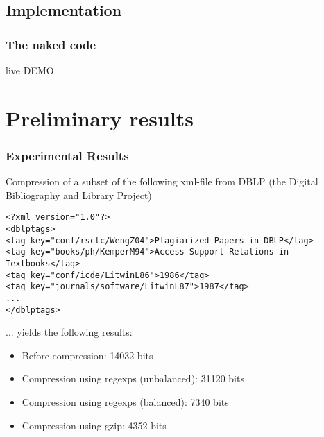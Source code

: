 \documentclass[slidestop,compress,mathserif, xcolor=table]{beamer}
\begin{document}
\subsection{Implementation}

\begin{frame}[c]
  \frametitle{The naked code}

  \begin{center}
    \Huge{live DEMO}
  \end{center}
  
\end{frame}

\section{Preliminary results}

\begin{frame}[fragile]
  \frametitle{Experimental Results}

  Compression of a subset of the following xml-file from DBLP (the Digital
  Bibliography and Library Project)

{\tiny
\begin{verbatim}
<?xml version="1.0"?>
<dblptags>
<tag key="conf/rsctc/WengZ04">Plagiarized Papers in DBLP</tag>
<tag key="books/ph/KemperM94">Access Support Relations in Textbooks</tag>
<tag key="conf/icde/LitwinL86">1986</tag>
<tag key="journals/software/LitwinL87">1987</tag>
...
</dblptags>
\end{verbatim}
} 

  ... yields the following results:

  \begin{itemize}
  \item Before compression: 14032 bits
  \item Compression using regexps (unbalanced): 31120 bits
  \item Compression using regexps (balanced): 7340 bits
  \item Compression using gzip: 4352 bits
  \end{itemize}

\end{frame}
\end{document}
